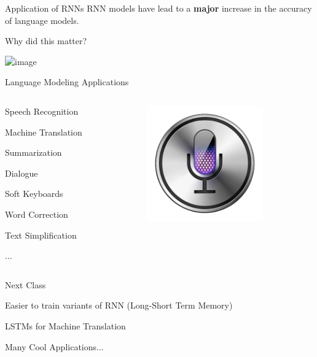 \documentclass{beamer}
\let\tempone\itemize
\let\temptwo\enditemize
\renewenvironment{itemize}{\tempone\addtolength{\itemsep}{0.5\baselineskip}}{\temptwo}
\begin{document}
\begin{frame}{Application of RNNs}
  RNN models have lead to a \textbf{major} increase in the accuracy of 
  language models.

  \begin{center}
    Why did this matter?
  \end{center}
  \pause

  \begin{center}
    \includegraphics<2>[width=9cm]{drumpf}
  \end{center}
\end{frame}

\begin{frame}{Language Modeling Applications}

  \begin{columns}    
    \begin{column}{0.5\textwidth}
  \begin{itemize}
  \item Speech Recognition
  \item Machine Translation
  \item Summarization
  \item Dialogue
  \item Soft Keyboards
  \item Word Correction
  \item Text Simplification
  \item $\ldots$
  \end{itemize}
  \end{column}


    \begin{column}{0.5\textwidth}
      \vspace{2cm}
     
      \includegraphics[width=5cm]{siri}
    \end{column}
  \end{columns}

\end{frame}

\begin{frame}{Next Class}
  
  \begin{itemize}
  \item Easier to train variants of RNN (Long-Short Term Memory)
  \item LSTMs for Machine Translation 
  \item Many Cool Applications...
  \end{itemize}

\end{frame}
\end{document}
